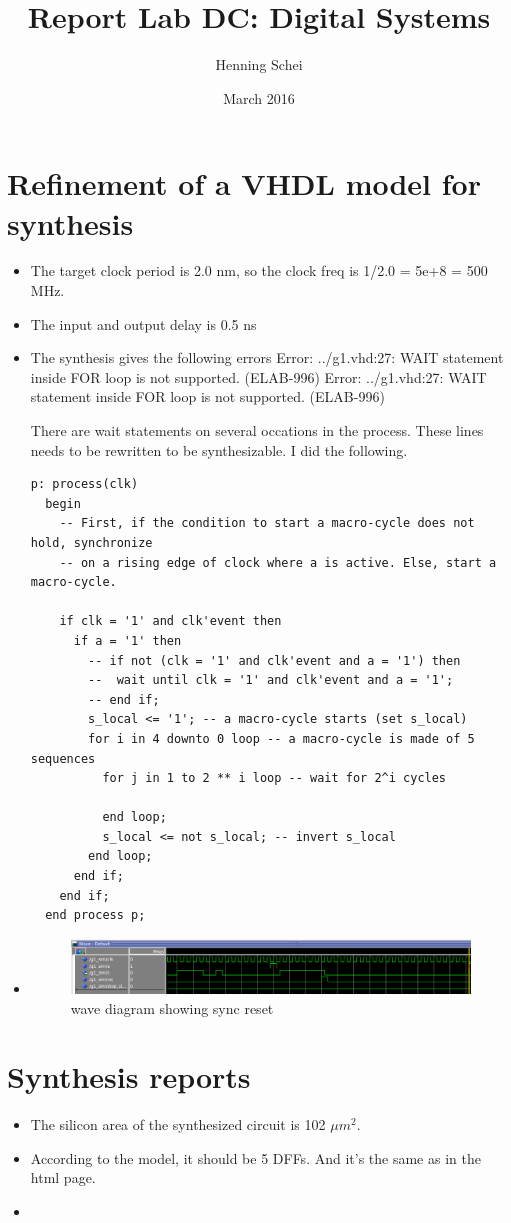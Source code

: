 \documentclass{article}
\title{Report Lab DC: Digital Systems}
\author{Henning Schei}
\date{March 2016}
\begin{document}
\maketitle


\section{Refinement of a VHDL model for synthesis}

\begin {itemize}
\item The target clock period is 2.0 nm, so the clock freq is 1/2.0 = 5e+8 = 500 MHz.
\item The input and output delay is 0.5 ns
\item The synthesis gives the following errors
Error:  ../g1.vhd:27: WAIT statement inside FOR loop is not supported. (ELAB-996)
Error:  ../g1.vhd:27: WAIT statement inside FOR loop is not supported. (ELAB-996)

There are wait statements on several occations in the process. These lines needs to be rewritten to be synthesizable. I did the following.


\begin{lstlisting}
p: process(clk)
  begin
    -- First, if the condition to start a macro-cycle does not hold, synchronize
    -- on a rising edge of clock where a is active. Else, start a macro-cycle.

    if clk = '1' and clk'event then
      if a = '1' then
        -- if not (clk = '1' and clk'event and a = '1') then
        --  wait until clk = '1' and clk'event and a = '1';
        -- end if;
        s_local <= '1'; -- a macro-cycle starts (set s_local)
        for i in 4 downto 0 loop -- a macro-cycle is made of 5 sequences
          for j in 1 to 2 ** i loop -- wait for 2^i cycles

          end loop;
          s_local <= not s_local; -- invert s_local
        end loop;
      end if;
    end if;
  end process p;
\end{lstlisting}

\item 
\begin{figure}[H]
\begin {center}
\includegraphics[scale=0.4]{syncrst.png}
\caption{wave diagram showing sync reset}
\end{center}
\end{figure}








\end {itemize}



\section {Synthesis reports}
\begin{itemize}
\item The silicon area of the synthesized circuit is 102 $\mu m^2$.
\item According to the model, it should be 5 DFFs. And it's the same as in the html page. 
\item   
\end{itemize}
\end{document}
